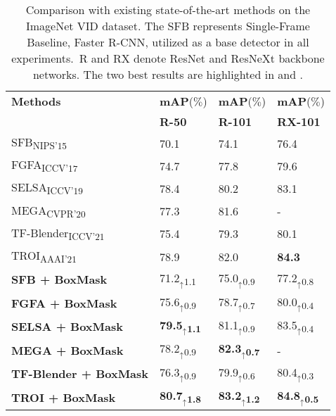 \documentclass[10pt,twocolumn,letterpaper]{article}
\begin{document}
\begin{table}
\begin{center}
    \small
    \begin{tabular}{llll}
    \toprule\noalign{\smallskip}
      \textbf{Methods} &  \textbf{mAP}($\%$) &  \textbf{mAP}($\%$) &  \textbf{mAP}($\%$)\\ &\textbf{R-50} &\textbf{R-101} &\textbf{RX-101} \\
    \noalign{\smallskip}
    \hline
    SFB\textsubscript{NIPS'15}\cite{ren2015faster}  & 70.1 & 74.1 & 76.4 \\
    FGFA\textsubscript{ICCV'17}\cite{zhu2017flow}  & 74.7& 77.8 & 79.6 \\
    SELSA\textsubscript{ICCV'19}\cite{wu2019sequence}  & 78.4 & 80.2 &  83.1\\
    MEGA\textsubscript{CVPR'20}\cite{chen2020memory}  & 77.3 & 81.6 & - \\
    TF-Blender\textsubscript{ICCV'21}\cite{cui2021tf}  & 75.4 & 79.3 &  80.1\\
    TROI\textsubscript{AAAI'21}\cite{gong2021temporal}  &78.9 & 82.0 & \textbf{\color{blue}84.3}\\
    \hline
    
    \textbf{SFB + BoxMask}& 71.2$_{\uparrow}$\textsubscript{1.1} & 75.0$_{\uparrow}$\textsubscript{0.9} & 77.2$_{\uparrow}$\textsubscript{0.8} \\
    \textbf{FGFA + BoxMask }& 75.6$_{\uparrow}$\textsubscript{0.9} & 78.7$_{\uparrow}$\textsubscript{0.7} & 80.0$_{\uparrow}$\textsubscript{0.4}\\
    \textbf{SELSA + BoxMask }& \textbf{\color{blue}79.5$_{\uparrow}$\textsubscript{1.1}} & 81.1$_{\uparrow}$\textsubscript{0.9} & 83.5$_{\uparrow}$\textsubscript{0.4}\\
    \textbf{MEGA + BoxMask }& 78.2$_{\uparrow}$\textsubscript{0.9}& \textbf{\color{blue}82.3$_{\uparrow}$\textsubscript{0.7}} & - \\
    \textbf{TF-Blender + BoxMask }& 76.3$_{\uparrow}$\textsubscript{0.9} & 79.9$_{\uparrow}$\textsubscript{0.6} & 80.4$_{\uparrow}$\textsubscript{0.3}\\
    \textbf{TROI + BoxMask }& \textbf{\color{red}80.7$_{\uparrow}$\textsubscript{1.8}}& \textbf{\color{red}83.2$_{\uparrow}$\textsubscript{1.2}} & \textbf{\color{red}84.8$_{\uparrow}$\textsubscript{0.5}}\\
    
    \bottomrule
    \end{tabular}
    \caption{\color{black} Comparison with existing state-of-the-art methods on the ImageNet VID dataset. The SFB represents Single-Frame Baseline, Faster R-CNN, utilized as a base detector in all experiments.~R and RX denote ResNet and ResNeXt backbone networks. The two best results are highlighted in \color{red}{red} \color{black} and \color{blue}{blue}\color{black}.}
    \label{table:sota_comparison}
\end{center}
\vspace{-20pt}
\end{table}
\end{document}
